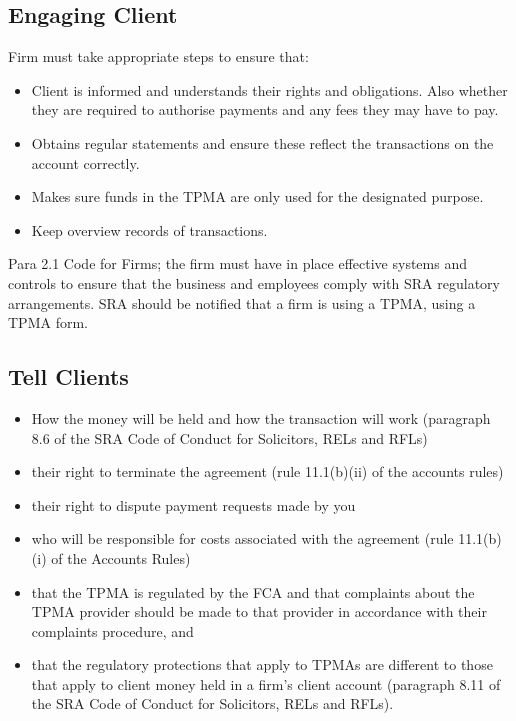 \documentclass[
]{article}
\providecommand{\tightlist}{%
  \setlength{\itemsep}{0pt}\setlength{\parskip}{0pt}}
\begin{document}
\hypertarget{engaging-client}{%
\subsection{Engaging Client}\label{engaging-client}}

Firm must take appropriate steps to ensure that:

\begin{itemize}
\tightlist
\item
  Client is informed and understands their rights and obligations. Also
  whether they are required to authorise payments and any fees they may
  have to pay.
\item
  Obtains regular statements and ensure these reflect the transactions
  on the account correctly.
\item
  Makes sure funds in the TPMA are only used for the designated purpose.
\item
  Keep overview records of transactions.
\end{itemize}

Para 2.1 Code for Firms; the firm must have in place effective systems
and controls to ensure that the business and employees comply with SRA
regulatory arrangements. SRA should be notified that a firm is using a
TPMA, using a TPMA form.

\hypertarget{tell-clients}{%
\subsection{Tell Clients}\label{tell-clients}}

\begin{itemize}
\tightlist
\item
  How the money will be held and how the transaction will work
  (paragraph 8.6 of the SRA Code of Conduct for Solicitors, RELs and
  RFLs)
\item
  their right to terminate the agreement (rule 11.1(b)(ii) of the
  accounts rules)
\item
  their right to dispute payment requests made by you
\item
  who will be responsible for costs associated with the agreement (rule
  11.1(b)(i) of the Accounts Rules)
\item
  that the TPMA is regulated by the FCA and that complaints about the
  TPMA provider should be made to that provider in accordance with their
  complaints procedure, and
\item
  that the regulatory protections that apply to TPMAs are different to
  those that apply to client money held in a firm's client account
  (paragraph 8.11 of the SRA Code of Conduct for Solicitors, RELs and
  RFLs).
\end{itemize}
\end{document}

